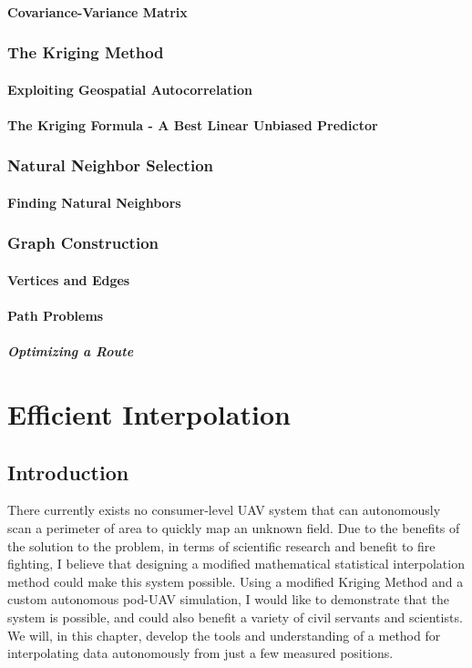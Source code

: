 \documentclass[11pt]{ucthesis}
\begin{document}
\subsection{Covariance-Variance Matrix}

\section{The Kriging Method}
\subsection{Exploiting Geospatial Autocorrelation}
\subsection{The Kriging Formula - A Best Linear Unbiased Predictor}

\section{Natural Neighbor Selection}
\subsection{Finding Natural Neighbors}

\section{Graph Construction}
\subsection{Vertices and Edges}
\subsection{Path Problems}
\subsubsection{Optimizing a Route}

\part{Efficient Interpolation}

\chapter{Introduction}
There currently exists no consumer-level UAV system that can autonomously scan a perimeter of area to quickly map an unknown field. Due to the benefits of the solution to the problem, in terms of scientific research and benefit to fire fighting, I believe that designing a modified mathematical statistical interpolation method could make this system possible. Using a modified Kriging Method and a custom autonomous pod-UAV simulation, I would like to demonstrate that the system is possible, and could also benefit a variety of civil servants and scientists. We will, in this chapter, develop the tools and understanding of a method for interpolating data autonomously from just a few measured positions.
\end{document}
